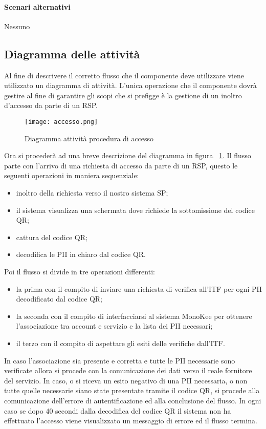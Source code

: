 \paragraph{Scenari alternativi}  Nessuno


\subsection{Diagramma delle attività}
Al fine di descrivere il corretto flusso che il componente deve utilizzare viene utilizzato un diagramma di attività. L’unica operazione che il componente dovrà gestire al fine di garantire gli scopi che si prefigge è la gestione di un inoltro d'accesso da parte di un RSP. 
\begin{figure}[!h]
    \centering
    \texttt{[image: accesso.png]} 
    \caption{Diagramma attività procedura di accesso}
    \label{fig:act-login} 
\end{figure}

Ora si procederà ad una breve descrizione del diagramma in figura ~\ref{fig:act-login}. 
Il flusso parte con l’arrivo di una richiesta di accesso da parte di un RSP, questo le seguenti operazioni in maniera sequenziale: 
\begin{itemize}
    \item inoltro della richiesta verso il nostro sistema SP;
    \item il sistema visualizza una schermata dove richiede la sottomissione del codice QR;
    \item cattura del codice QR;
    \item decodifica le PII in chiaro dal codice QR.
\end{itemize}


Poi il flusso si divide in tre operazioni differenti:
\begin{itemize}
    \item la prima con il compito di inviare una richiesta di verifica all’ITF per ogni PII decodificato dal codice QR;
    \item la seconda con il compito di interfacciarsi al sistema MonoKee per ottenere l’associazione tra account e servizio e la lista dei PII necessari;
    \item il terzo con il compito di aspettare gli esiti delle verifiche dall’ITF.
\end{itemize}
In caso l’associazione sia presente e corretta e tutte le PII necessarie sono verificate allora si procede con la comunicazione dei dati verso il reale fornitore del servizio.
In caso, o si riceva un esito negativo di una PII necessaria, o non tutte quelle necessarie siano state presentate tramite il codice QR, si procede alla comunicazione dell’errore di autentificazione ed alla conclusione del flusso.
In ogni caso se dopo 40 secondi dalla decodifica del codice QR il sistema non ha effettuato l’accesso viene visualizzato un messaggio di errore ed il flusso termina.
